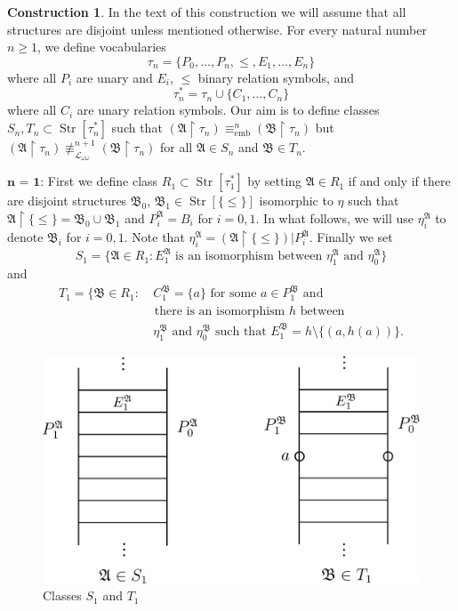 \documentclass{ndjflart}
\theoremstyle{plain}
\theoremstyle{definition}
\newtheorem{construction}[conjecture]{Construction}
\numberwithin{equation}{section}
\DeclareMathOperator{\emb}{emb}
\DeclareMathOperator{\Str}{Str}
\begin{document}
\begin{construction}
In the text of this construction we will assume that all structures are disjoint unless mentioned otherwise.
For every natural number $n \geq 1$, we define vocabularies
\[
	\tau_n = \{P_0,\dots,P_n,\leq,E_1,\dots,E_n\}
\] 
where all $P_i$ are unary and $E_i$, $\leq$ binary relation symbols, and 
\[
	\tau_n^* = \tau_n \cup \{C_1,\dots,C_n\}
\]
where all $C_i$ are unary relation symbols.
Our aim is to define classes $S_n, T_n \subset \Str[\tau_n^*]$ such that $(\mathfrak{A} \upharpoonright \tau_n) \equiv_{\emb}^n (\mathfrak{B} \upharpoonright \tau_n)$ but 
$(\mathfrak{A} \upharpoonright \tau_n) \not \equiv_{\mathcal{L}_{\omega\omega}}^{n+1} (\mathfrak{B} \upharpoonright \tau_n)$ for all $\mathfrak{A} \in S_n$ and $\mathfrak{B} \in T_n$.

$\textbf{n = 1:}$
First we define class $R_1 \subset \Str[\tau_1^*]$ by setting $\mathfrak{A} \in R_1$ if and only if there are disjoint structures $\mathfrak{B}_0$, $\mathfrak{B}_1 \in \Str[\{\leq\}]$ isomorphic to $\eta$ such that 
$\mathfrak{A} \upharpoonright \{\leq\} = \mathfrak{B}_0 \cup \mathfrak{B}_1$ and 
$P_i^{\mathfrak{A}} = B_i$ for $i = 0,1$.
In what follows, we will use $\eta^{\mathfrak{A}}_i$ to denote $\mathfrak{B}_i$ for $i = 0,1$. Note that $\eta_i^{\mathfrak{A}} = (\mathfrak{A} \upharpoonright \{\leq\}) | P_i^{\mathfrak{A}}$.
Finally we set
\[
	S_1 = \{\mathfrak{A}\in R_1 \colon E_1^{\mathfrak{A}} \text{ is an isomorphism between } \eta^{\mathfrak{A}}_1 \text{ and } \eta^{\mathfrak{A}}_0 \}
\]
and
\begin{align*}
	T_1 = \{\mathfrak{B}\in R_1 \colon &\  C_1^{\mathfrak{B}} = \{a\} \text{ for some } a \in P^{\mathfrak{B}}_1 \text{ and } \\
	& \text{ there is an isomorphism } h \text{ between }\\ &\ \eta^{\mathfrak{B}}_1 \text{ and }\eta^{\mathfrak{B}}_0 \text{ such that } E_1^{\mathfrak{B}} = h \setminus \{(a,h(a))\}.
\end{align*}

\begin{figure}
	\centering
	\includegraphics[scale = 0.8]{figs/figure1}
	\caption{Classes $S_1$ and $T_1$}
	\label{fig1}
\end{figure} 


\end{construction}
\end{document}
